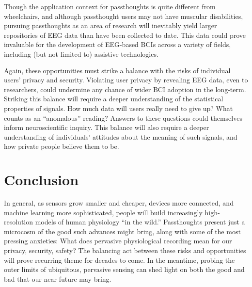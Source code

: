 \documentclass[sigconf]{acmart}
\begin{document}
Though the application context for passthoughts is quite different from wheelchairs,
and although passthought users may not have muscular disabilities,
pursuing passthoughts as an area of research will inevitably yield larger repositories of EEG data than have been collected to date.
This data could prove invaluable for the development of EEG-based BCIs across a variety of fields, including (but not limited to) assistive technologies.

Again, these opportunities must strike a balance with the risks of individual users' privacy and security.
Violating user privacy by revealing EEG data, even to researchers, could undermine any chance of wider BCI adoption in the long-term.
Striking this balance will require a deeper understanding of the statistical properties of signals. 
How much data will users really need to give up? 
What counts as an ``anomalous'' reading?
Answers to these questions could themselves inform neuroscientific inquiry.
This balance will also require a deeper understanding of individuals' attitudes about the meaning of such signals,
and how private people believe them to be.
\section{Conclusion}
\label{sec:org50f75b6}

In general, as sensors grow smaller and cheaper, devices more connected, and machine learning more sophisticated, 
people will build increasingly high-resolution models of human physiology ``in the wild.''
Passthoughts present just a microcosm of the good such advances might bring, 
along with some of the most pressing anxieties: 
What does pervasive physiological recording mean for our privacy, security, safety? 
The balancing act between these risks and opportunities will prove recurring theme for decades to come.
In the meantime, probing the outer limits of ubiquitous, pervasive sensing can shed light on both the good and bad that our near future may bring.



\balance
\end{document}
